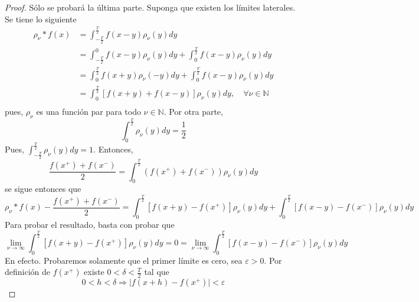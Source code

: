 \documentclass[12pt]{report}
\theoremstyle{largebreak}
\newcommand\abs[1]{\ensuremath{\big|#1\big|}}
\begin{document}
    \begin{proof}
        Sólo se probará la última parte. Suponga que existen los límites laterales. Se tiene lo siguiente
        \begin{equation*}
            \begin{split}
                \rho_\nu*f(x)&=\int_{-\frac{T}{2}}^{\frac{T}{2}}f(x-y)\rho_\nu(y)dy\\
                &=\int_{-\frac{T}{2}}^{0}f(x-y)\rho_\nu(y)dy+\int_{0}^{\frac{T}{2}}f(x-y)\rho_\nu(y)dy\\
                &=\int_{0}^{\frac{T}{2}}f(x+y)\rho_\nu(-y)dy+\int_{0}^{\frac{T}{2}}f(x-y)\rho_\nu(y)dy\\
                &=\int_{0}^{\frac{T}{2}}\left[f(x+y)+f(x-y) \right]\rho_\nu(y)dy,\quad\forall\nu\in\mathbb{N} \\
            \end{split}
        \end{equation*}
        pues, $\rho_\nu$ es una función par para todo $\nu\in\mathbb{N}$. Por otra parte, 
        \begin{equation*}
            \int_{0}^{\frac{T}{2}}\rho_\nu(y)dy=\frac{1}{2}
        \end{equation*}
        Pues, $\int_{-\frac{T}{2}}^{\frac{T}{2}}\rho_\nu(y)dy=1$. Entonces,
        \begin{equation*}
            \frac{f(x^+)+f(x^-)}{2}=\int_0^{\frac{T}{2}}(f(x^+)+f(x^-))\rho_\nu(y)dy
        \end{equation*}
        se sigue entonces que
        \begin{equation*}
            \rho_\nu*f(x)-\frac{f(x^+)+f(x^-)}{2}=\int_0^{\frac{T}{2}}\left[f(x+y)-f(x^+)\right]\rho_\nu(y)dy+\int_0^{\frac{T}{2}}\left[f(x-y)-f(x^-)\right]\rho_\nu(y)dy
        \end{equation*}
        Para probar el resultado, basta con probar que
        \begin{equation*}
            \lim_{\nu\rightarrow\infty}\int_0^{\frac{T}{2}}\left[f(x+y)-f(x^+)\right]\rho_\nu(y)dy=0=\lim_{\nu\rightarrow\infty}\int_0^{\frac{T}{2}}\left[f(x-y)-f(x^-)\right]\rho_\nu(y)dy
        \end{equation*}
        En efecto. Probaremos solamente que el primer límite es cero, sea $\varepsilon>0$. Por definición de $f(x^+)$ existe $0<\delta<\frac{T}{2}$ tal que
        \begin{equation*}
            0<h<\delta\Rightarrow\abs{f(x+h)-f(x^+)}<\varepsilon
        \end{equation*}

\end{proof}
\end{document}
